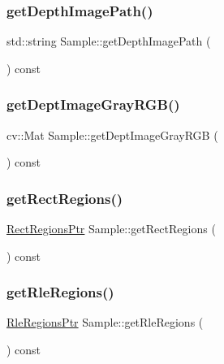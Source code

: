 \subsubsection{\texorpdfstring{get\+Depth\+Image\+Path()}{getDepthImagePath()}}
{\footnotesize\ttfamily std\+::string Sample\+::get\+Depth\+Image\+Path (\begin{DoxyParamCaption}{ }\end{DoxyParamCaption}) const}

\mbox{\label{struct_sample_ac1506dc52a2f8b5bcb130c380492b784}} 
\subsubsection{\texorpdfstring{get\+Dept\+Image\+Gray\+R\+G\+B()}{getDeptImageGrayRGB()}}
{\footnotesize\ttfamily cv\+::\+Mat Sample\+::get\+Dept\+Image\+Gray\+R\+GB (\begin{DoxyParamCaption}{ }\end{DoxyParamCaption}) const}

\mbox{\label{struct_sample_a5f1b7716e5c4e8f5217a18021169283f}} 
\subsubsection{\texorpdfstring{get\+Rect\+Regions()}{getRectRegions()}}
{\footnotesize\ttfamily \hyperlink{_rect_regions_8h_af395a1050a923eecf6862568feaf5d1d}{Rect\+Regions\+Ptr} Sample\+::get\+Rect\+Regions (\begin{DoxyParamCaption}{ }\end{DoxyParamCaption}) const}

\mbox{\label{struct_sample_aba47baeaed03136d0b63ca6609de25a7}} 
\subsubsection{\texorpdfstring{get\+Rle\+Regions()}{getRleRegions()}}
{\footnotesize\ttfamily \hyperlink{_rle_regions_8h_a9bcb41ed7094063e159a665178703e0f}{Rle\+Regions\+Ptr} Sample\+::get\+Rle\+Regions (\begin{DoxyParamCaption}{ }\end{DoxyParamCaption}) const}


